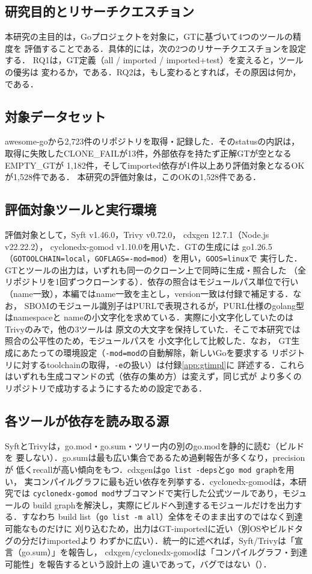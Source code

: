 \documentclass{css}
\def\|{\verb|}
\begin{document}
\subsection{研究目的とリサーチクエスチョン}
本研究の主目的は，Goプロジェクトを対象に，GTに基づいて4つのツールの精度を
評価することである．具体的には，次の2つのリサーチクエスチョンを設定する．
RQ1は，GT定義（all / imported / imported+test）を変えると，ツールの優劣は
変わるか，である．RQ2は，もし変わるとすれば，その原因は何か，である．

\subsection{対象データセット}
awesome-goから2{,}723件のリポジトリを取得・記録した．そのstatusの内訳は，
取得に失敗したCLONE\_FAILが13件，外部依存を持たず正解GTが空となるEMPTY\_GTが
1{,}182件，そしてimported依存が1件以上あり評価対象となるOKが1{,}528件である．
本研究の評価対象は，このOKの1{,}528件である．

\subsection{評価対象ツールと実行環境}
評価対象として，Syft v1.46.0\cite{syft}，Trivy v0.72.0\cite{trivy}，
cdxgen 12.7.1（Node.js v22.22.2）\cite{cdxgen}，
cyclonedx-gomod v1.10.0\cite{gomodtool}を用いた．GTの生成には
go1.26.5（\|GOTOOLCHAIN=local|，\|GOFLAGS=-mod=mod|）を用い，\|GOOS=linux|で
実行した．GTとツールの出力は，いずれも同一のクローン上で同時に生成・照合した
（全リポジトリを1回ずつクローンする）．依存の照合はモジュールパス単位で行い
（name一致），本編ではname一致を主とし，version一致は付録で補足する．なお，
SBOMのモジュール識別子はPURLで表現されるが，PURL仕様のgolang型はnamespaceと
nameの小文字化を求めている．実際に小文字化していたのはTrivyのみで，他の3ツールは
原文の大文字を保持していた．そこで本研究では照合の公平性のため，モジュールパスを
小文字化して比較した．なお，
GT生成にあたっての環境設定（\|-mod=mod|の自動解除，新しいGoを要求する
リポジトリに対するtoolchainの取得，\|-e|の扱い）は付録\ref{app:gtimpl}に
詳述する．これらはいずれも生成コマンドの式（依存の集め方）は変えず，同じ式が
より多くのリポジトリで成功するようにするための設定である．

\subsection{各ツールが依存を読み取る源}
SyftとTrivyは，go.mod・go.sum・ツリー内の別のgo.modを静的に読む（ビルドを
要しない）．go.sumは最も広い集合であるため過剰報告が多くなり，precisionが
低くrecallが高い傾向をもつ．cdxgenは\|go list -deps|と\|go mod graph|を用い，
実コンパイルグラフに最も近い依存を列挙する．cyclonedx-gomodは，本研究では
\|cyclonedx-gomod mod|サブコマンドで実行した公式ツールであり，モジュールの
build graphを解決し，実際にビルドへ到達するモジュールだけを出力する．すなわち
build list（\|go list -m all|）全体をそのまま出すのではなく到達可能なものだけに
刈り込むため，出力はGT-importedに近い（別OSやビルドタグの分だけimportedより
わずかに広い）．統一的に述べれば，Syft/Trivyは「宣言（go.sum）」を報告し，
cdxgen/cyclonedx-gomodは「コンパイルグラフ・到達可能性」を報告するという設計上の
違いであって，バグではない（）．
\end{document}
